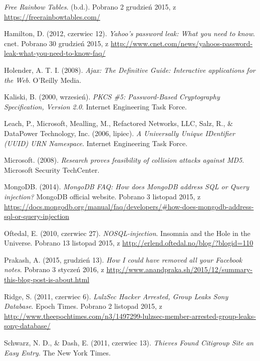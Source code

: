\documentclass[12pt,polish,a4paper,]{report}
\begin{document}
\hypertarget{ref-rainbowux5ftables}{}
\emph{Free Rainbow Tables}. (b.d.). Pobrano 2 grudzień 2015, z
\url{https://freerainbowtables.com/}

\hypertarget{ref-yahooux5fbreach}{}
Hamilton, D. (2012, czerwiec 12). \emph{Yahoo's password leak: What you
need to know}. c\textbar{}net. Pobrano 30 grudzień 2015, z
\url{http://www.cnet.com/news/yahoos-password-leak-what-you-need-to-know-faq/}

\hypertarget{ref-ajaxux5fguide}{}
Holender, A. T. I. (2008). \emph{Ajax: The Definitive Guide: Interactive
applications for the Web}. O'Reilly Media.

\hypertarget{ref-pbkdf2ux5frecommended}{}
Kaliski, B. (2000, wrzesień). \emph{PKCS \#5: Password-Based
Cryptography Specification, Version 2.0}. Internet Engineering Task
Force.

\hypertarget{ref-uuidux5frfc}{}
Leach, P., Microsoft, Mealling, M., Refactored Networks, LLC, Salz, R.,
\& DataPower Technology, Inc. (2006, lipiec). \emph{A Universally Unique
IDentifier (UUID) URN Namespace}. Internet Engineering Task Force.

\hypertarget{ref-md5ux5fnotux5fsuitableux5fms}{}
Microsoft. (2008). \emph{Research proves feasibility of collision
attacks against MD5}. Microsoft Security TechCenter.

\hypertarget{ref-nosqlux5fpreventsux5finjection}{}
MongoDB. (2014). \emph{MongoDB FAQ: How does MongoDB address SQL or
Query injection?} MongoDB official website. Pobrano 3 listopad 2015, z
\url{https://docs.mongodb.org/manual/faq/developers/\#how-does-mongodb-address-sql-or-query-injection}

\hypertarget{ref-nosqlux5finjection}{}
Oftedal, E. (2010, czerwiec 27). \emph{NOSQL-injection}. Insomnia and
the Hole in the Universe. Pobrano 13 listopad 2015, z
\url{http://erlend.oftedal.no/blog/?blogid=110}

\hypertarget{ref-facebookux5fidor}{}
Prakash, A. (2015, grudzień 13). \emph{How I could have removed all your
Facebook notes}. Pobrano 3 styczeń 2016, z
\url{http://www.anandpraka.sh/2015/12/summary-this-blog-post-is-about.html}

\hypertarget{ref-lulzux5fsecux5fsony}{}
Ridge, S. (2011, czerwiec 6). \emph{LulzSec Hacker Arrested, Group Leaks
Sony Database}. Epoch Times. Pobrano 2 listopad 2015, z
\url{http://www.theepochtimes.com/n3/1497299-lulzsec-member-arrested-group-leaks-sony-database/}

\hypertarget{ref-citiux5fidor}{}
Schwarz, N. D., \& Dash, E. (2011, czerwiec 13). \emph{Thieves Found
Citigroup Site an Easy Entry}. The New York Times.
\end{document}
